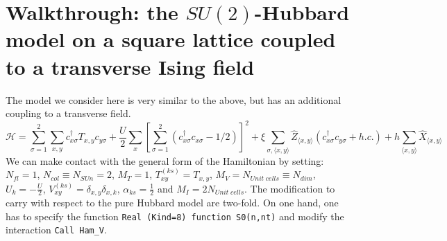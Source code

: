 \section{Walkthrough: the $SU(2)$-Hubbard model on a square lattice coupled to a transverse Ising field}




The model we consider here  is very similar to the  above,  but has an additional coupling to a transverse field. 
\begin{equation}
\label{eqn_hubbard_sun_Ising}
\mathcal{H}=
\sum\limits_{\sigma=1}^{2} 
\sum\limits_{x,y } 
  c^{\dagger}_{x \sigma} T_{x,y}c^{\phantom\dagger}_{y \sigma} 
+ \frac{U}{2}\sum\limits_{x}\left[
\sum\limits_{\sigma=1}^{2}
\left(  c^{\dagger}_{x \sigma} c^{\phantom\dagger}_{x \sigma}  -1/2 \right) \right]^{2}   
+  \xi \sum_{\sigma,\langle x,y \rangle} \hat{Z}_{\langle x,y \rangle}  \left( c^{\dagger}_{x \sigma} c^{\phantom\dagger}_{y \sigma}  + h.c. \right) + h \sum_{\langle x,y \rangle} \hat{X}_{\langle x,y \rangle}
\end{equation}
We can make contact with the general form of the Hamiltonian by setting: 
$N_{fl} = 1$, $N_{col} \equiv N_{SUn}     =2 $,   $M_T    =    1$,  $T^{(ks)}_{x y}   =  T_{x,y}$,  $M_V   =  N_{Unit\; cells} \equiv N_{dim}$,  $U_{k}       =   -\frac{U}{2}$, 
 $V_{x y}^{(ks)} =  \delta_{x,y} \delta_{x,k}$,  $\alpha_{ks}   =  \frac{1}{2}  $ and $M_I       = 2 N_{Unit\; cells} $.
The modification to carry  with respect to the pure Hubbard model are two-fold.  On one hand, one has to specify the function \texttt{Real (Kind=8) function S0(n,nt)} and modify the interaction \texttt{Call Ham\_V}.


